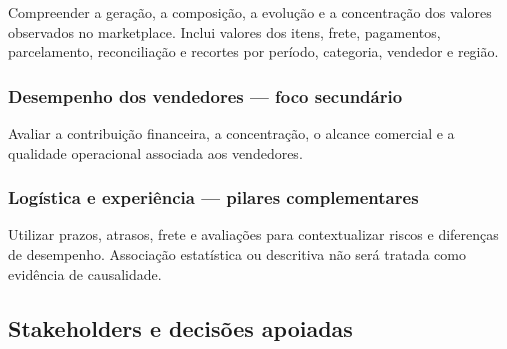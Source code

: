 \documentclass[12pt,a4paper]{article}
\begin{document}
Compreender a geração, a composição, a evolução e a concentração dos
valores observados no marketplace. Inclui valores dos itens, frete,
pagamentos, parcelamento, reconciliação e recortes por período,
categoria, vendedor e região.

\subsubsection{Desempenho dos vendedores --- foco
secundário}\label{docs__analytics__contrato_analitico.md__desempenho-dos-vendedores-foco-secunduxe1rio}

Avaliar a contribuição financeira, a concentração, o alcance comercial e
a qualidade operacional associada aos vendedores.

\subsubsection{Logística e experiência --- pilares
complementares}\label{docs__analytics__contrato_analitico.md__loguxedstica-e-experiuxeancia-pilares-complementares}

Utilizar prazos, atrasos, frete e avaliações para contextualizar riscos
e diferenças de desempenho. Associação estatística ou descritiva não
será tratada como evidência de causalidade.

\subsection{Stakeholders e decisões
apoiadas}\label{docs__analytics__contrato_analitico.md__stakeholders-e-decisuxf5es-apoiadas}
\end{document}
